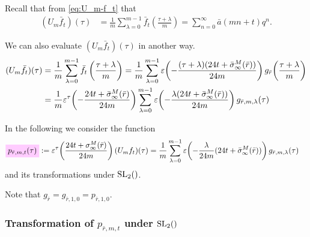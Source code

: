 \documentclass{article}
\begin{document}
Recall that from \eqref{eq:U_m-f_t} that
\begin{align}
  (U_m\bar{f}_t)(\tau)
  &=
  \frac{1}{m} \sum_{\lambda=0}^{m-1}\bar{f}_t\left(\frac{\tau+\lambda}{m}\right)
  =
    \sum_{n=0}^\infty \bar{a}(mn+t) q^n.
  \label{eq:U_m-fbar_t}
\end{align}

We can also evaluate $(U_m\bar{f}_t)(\tau)$ in another way.
%
\begin{align*}
  (U_m\bar{f}_t)(\tau)
  &=
  \frac{1}{m} \sum_{\lambda=0}^{m-1}\bar{f}_t\left(\frac{\tau+\lambda}{m}\right)
    =
    \frac{1}{m} \sum_{\lambda=0}^{m-1}
    \unityPower{-\frac{(\tau+\lambda) (24 t + \sigmainftybar[M]{\bar{r}})}{24 m}}
    g_{\bar{r}}\!\left(\frac{\tau+\lambda}{m}\right)
  \\
  &=
  \frac{1}{m}
  \unityPowerTau{-\frac{24t+\sigmainftybar[M]{\bar{r}}}{24m}}
  \sum_{\lambda=0}^{m-1}
  \unityPower{-\frac{\lambda (24t+\sigmainftybar[M]{\bar{r}})}{24m}}
  g_{\bar{r},m,\lambda}(\tau)
\end{align*}


In the following we consider the function
\begin{align}
  \defineNotation[p-rbar-m-t-tau]{p_{\bar{r},m,t}(\tau)}
  &:= \unityPowerTau{\frac{24t+\sigmainfty[M]{\bar{r}}}{24m} } (U_mf_t)(\tau)
  =
    \frac{1}{m} \sum_{\lambda=0}^{m-1}
    \unityPower{-\frac{\lambda}{24m} (24t+\sigmainftybar[M]{\bar{r}})}
    g_{\bar{r},m,\lambda}(\tau)
  \label{eq:p_rbar-m-t(tau)}
\end{align}
and its transformations under $\SL2Z$.

Note that $g_{\bar{r}} = g_{\bar{r},1,0}=p_{\bar{r},1,0}$.


\subsubsection{Transformation of $p_{\bar{r},m,t}$ under $\SL2Z$}
\end{document}
